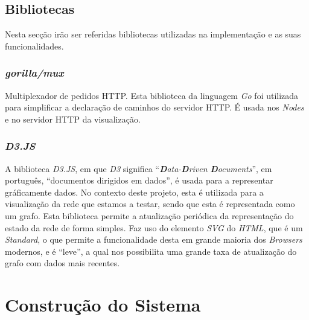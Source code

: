\subsection*{Bibliotecas}
\label{chap3:bibliotecas}
Nesta secção irão ser referidas bibliotecas utilizadas na implementação e as suas funcionalidades.

\subsubsection*{\emph{gorilla/mux}}
Multiplexador de pedidos \acs{HTTP}. Esta biblioteca da linguagem \emph{Go} foi utilizada para simplificar a declaração de caminhos do servidor \acs{HTTP}. É usada nos \emph{Nodes} e no servidor \acs{HTTP} da visualização.

\subsubsection*{\emph{D3.JS}}
A biblioteca \emph{D3.JS}, em que \emph{D3} significa ``\emph{\textbf{D}ata-\textbf{D}riven \textbf{D}ocuments}'', em português, ``documentos dirigidos em dados'', é usada para a representar gráficamente dados.
No contexto deste projeto, esta é utilizada para a visualização da rede que estamos a testar, sendo que esta é representada como um grafo.
Esta biblioteca permite a atualização periódica da representação do estado da rede de forma simples.
Faz uso do elemento \emph{\acs{SVG}} do \emph{\acs{HTML}}, que é um \emph{Standard}, o que permite a funcionalidade desta em grande maioria dos \emph{Browsers} modernos, e é ``leve'', a qual nos possibilita uma grande taxa de atualização do grafo com dados mais recentes.





\section{Construção do Sistema}
\label{validacao:sec:construcao}

